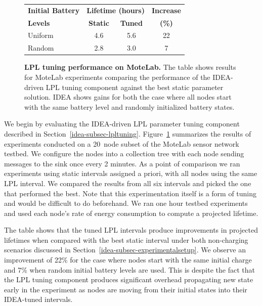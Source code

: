 \begin{figure}[t]
\begin{center}
\begin{tabular}{|l|ccc|}
\hline
\textbf{Initial Battery} & \multicolumn{2}{c}{\textbf{Lifetime (hours)}} & \textbf{Increase} \\
\textbf{Levels} & \textbf{Static} & \textbf{Tuned} & \textbf{(\%)} \\ \hline
Uniform & 4.6 & 5.6 & 22\\
Random & 2.8 & 3.0 & 7 \\ \hline
\end{tabular}
\end{center}

\caption{\textbf{LPL tuning performance on MoteLab.} The table shows results
for MoteLab experiments comparing the performance of the IDEA-driven LPL
tuning component against the best static parameter solution. IDEA shows gains
for both the case where all nodes start with the same battery level and
randomly initialized battery states.}

\label{idea-table-lplvoptimalmotelab}
\end{figure}

We begin by evaluating the IDEA-driven LPL parameter tuning component
described in Section~\ref{idea-subsec-lpltuning}.
Figure~\ref{idea-table-lplvoptimalmotelab} summarizes the results of
experiments conducted on a 20~node subset of the MoteLab sensor network
testbed. We configure the nodes into a collection tree with each node sending
messages to the sink once every 2 minutes. As a point of comparison we ran
experiments using static intervals assigned a priori, with all nodes using
the same LPL interval. We compared the results from all six intervals and
picked the one that performed the best. Note that this experimentation itself
is a form of tuning and would be difficult to do beforehand. We ran one hour
testbed experiments and used each node's rate of energy consumption to
compute a projected lifetime.

The table shows that the tuned LPL intervals produce improvements in
projected lifetimes when compared with the best static interval under both
non-charging scenarios discussed in
Section~\ref{idea-subsec-experimentalsetup}.  We observe an improvement of
22\% for the case where nodes start with the same initial charge and 7\% when
random initial battery levels are used. This is despite the fact that the LPL
tuning component produces significant overhead propagating new state early in
the experiment as nodes are moving from their initial states into their
IDEA-tuned intervals.

